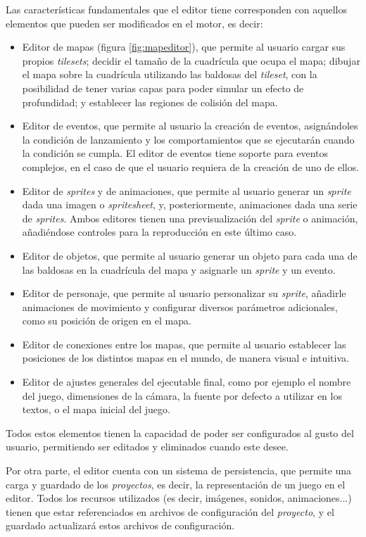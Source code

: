 Las características fundamentales que el editor tiene corresponden con aquellos elementos que pueden ser modificados en el motor, es decir:
\begin{itemize}
	\item Editor de mapas (figura \ref{fig:mapeditor}), que permite al usuario cargar sus propios \textit{tilesets}; decidir el tamaño de la cuadrícula que ocupa el mapa; dibujar el mapa sobre la cuadrícula utilizando las baldosas del \textit{tileset}, con la posibilidad de tener varias capas para poder simular un efecto de profundidad; y establecer las regiones de colisión del mapa.
	\item Editor de eventos, que permite al usuario la creación de eventos, asignándoles la condición de lanzamiento y los comportamientos que se ejecutarán cuando la condición se cumpla. El editor de eventos tiene soporte para eventos complejos, en el caso de que el usuario requiera de la creación de uno de ellos.
	\item Editor de \textit{sprites} y de animaciones, que permite al usuario generar un \textit{sprite} dada una imagen o \textit{spritesheet}, y, posteriormente, animaciones dada una serie de \textit{sprites}. Ambos editores tienen una previsualización del \textit{sprite} o animación, añadiéndose controles para la reproducción en este último caso. 
	\item Editor de objetos, que permite al usuario generar un objeto para cada una de las baldosas en la cuadrícula del mapa y asignarle un \textit{sprite} y un evento.
	\item Editor de personaje, que permite al usuario personalizar su \textit{sprite}, añadirle animaciones de movimiento y configurar diversos parámetros adicionales, como su posición de origen en el mapa.
	\item Editor de conexiones entre los mapas, que permite al usuario establecer las posiciones de los distintos mapas en el mundo, de manera visual e intuitiva.
	\item Editor de ajustes generales del ejecutable final, como por ejemplo el nombre del juego, dimensiones de la cámara, la fuente por defecto a utilizar en los textos, o el mapa inicial del juego.
\end{itemize} 

Todos estos elementos tienen la capacidad de poder ser configurados al gusto del usuario, permitiendo ser editados y eliminados cuando este desee.

\medskip

Por otra parte, el editor cuenta con un sistema de persistencia, que permite una carga y guardado de los \textit{proyectos}, es decir, la representación de un juego en el editor. Todos los recursos utilizados (es decir, imágenes, sonidos, animaciones...) tienen que estar referenciados en archivos de configuración del \textit{proyecto}, y el guardado actualizará estos archivos de configuración.

